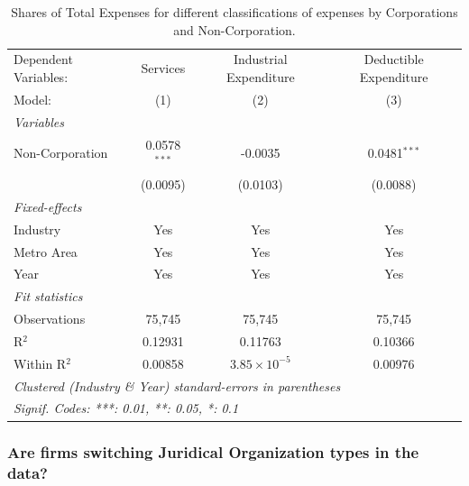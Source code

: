 \documentclass[
  12pt]{article}
\theoremstyle{definition}
\theoremstyle{remark}
\begin{document}
\begin{table}

\caption{\label{tbl-reg-shares-3}Shares of Total Expenses for different
classifications of expenses by Corporations and Non-Corporation.}

\begin{minipage}{\linewidth}

\begingroup
\centering
\begin{tabular}{lccc}
   \tabularnewline \midrule \midrule
   Dependent Variables: & Services       & Industrial Expenditure & Deductible Expenditure\\  
   Model:               & (1)            & (2)                    & (3)\\  
   \midrule
   \emph{Variables}\\
   Non-Corporation      & 0.0578$^{***}$ & -0.0035                & 0.0481$^{***}$\\   
                        & (0.0095)       & (0.0103)               & (0.0088)\\   
   \midrule
   \emph{Fixed-effects}\\
   Industry             & Yes            & Yes                    & Yes\\  
   Metro Area           & Yes            & Yes                    & Yes\\  
   Year                 & Yes            & Yes                    & Yes\\  
   \midrule
   \emph{Fit statistics}\\
   Observations         & 75,745         & 75,745                 & 75,745\\  
   R$^2$                & 0.12931        & 0.11763                & 0.10366\\  
   Within R$^2$         & 0.00858        & $3.85\times 10^{-5}$   & 0.00976\\  
   \midrule \midrule
   \multicolumn{4}{l}{\emph{Clustered (Industry \& Year) standard-errors in parentheses}}\\
   \multicolumn{4}{l}{\emph{Signif. Codes: ***: 0.01, **: 0.05, *: 0.1}}\\
\end{tabular}
\par\endgroup

\end{minipage}%

\end{table}%

\subsubsection{Are firms switching Juridical Organization types in the
data?}\label{are-firms-switching-juridical-organization-types-in-the-data}
\end{document}
